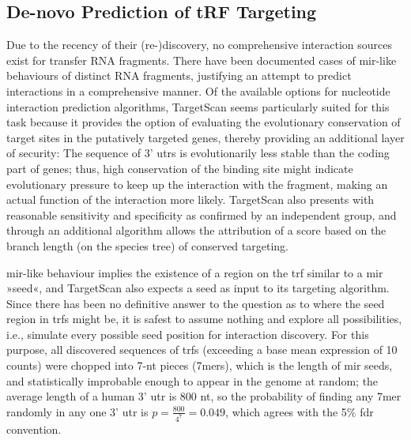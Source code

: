 \subsection{De-novo Prediction of tRF Targeting}
Due to the recency of their (re-)discovery, no comprehensive interaction sources exist for transfer RNA fragments. There have been documented cases of \ac{mir}-like behaviours of distinct RNA fragments\cite{Cole2009,Kumar2014}, justifying an attempt to predict interactions in a comprehensive manner. Of the available options for nucleotide interaction prediction algorithms, TargetScan\cite{Friedman2009} seems particularly suited for this task because it provides the option of evaluating the evolutionary conservation of target sites in the putatively targeted genes, thereby providing an additional layer of security: The sequence of 3' \acp{utr} is evolutionarily less stable than the coding part of genes; thus, high conservation of the binding site might indicate evolutionary pressure to keep up the interaction with the fragment, making an actual function of the interaction more likely. TargetScan also presents with reasonable sensitivity and specificity as confirmed by an independent group\cite{Alexiou2009}, and through an additional algorithm allows the attribution of a score based on the branch length (on the species tree) of conserved targeting\cite{Agarwal2015}.

\ac{mir}-like behaviour implies the existence of a region on the \ac{trf} similar to a \ac{mir} »seed«, and TargetScan also expects a seed as input to its targeting algorithm. Since there has been no definitive answer to the question as to where the seed region in \acp{trf} might be, it is safest to assume nothing and explore all possibilities, i.e., simulate every possible seed position for interaction discovery. For this purpose, all discovered sequences of \acp{trf} (exceeding a base mean expression of 10 counts) were chopped into 7-nt pieces (7mers), which is the length of \ac{mir} seeds, and statistically improbable enough to appear in the genome at random; the average length of a human 3' \ac{utr} is 800 \ac{nt}, so the probability of finding any 7mer randomly in any one 3' \ac{utr} is $p = \frac{800}{4^7} = 0.049$, which agrees with the 5\% \ac{fdr} convention.


